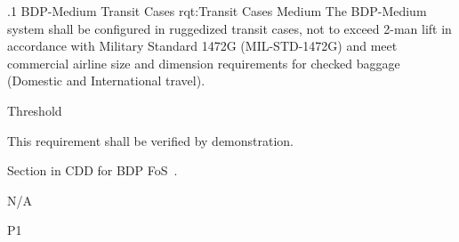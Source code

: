 \ONERQMTVKSA
{\RqtNumberBase.1}
{BDP-Medium Transit Cases}
{rqt:Transit Cases Medium}
{The BDP-Medium system shall be configured in ruggedized transit cases, not to exceed 2-man lift in accordance with Military Standard 1472G (MIL-STD-1472G) and meet commercial airline size and dimension requirements for checked baggage (Domestic and International travel).}
{
	\item [Phase 1] Threshold
}
{This requirement shall be verified by demonstration.}
{
\item [5.5.7.2] Section in CDD for BDP FoS~\cite{ref__BDP_FOS_CDD}.
}
{
	\item N/A
}
{P1}
